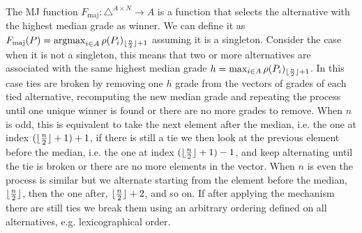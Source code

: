 	The \ac{MJ} function $F_\text{maj}:\triangle^{A \times N} \rightarrow A$	is a function that selects the alternative with the highest median grade as winner. We can define it as $F_\text{maj}(P) = \operatorname*{argmax}_{i\in A}\rho(P_i)_{\lfloor\frac{n}{2}\rfloor+ 1}$ assuming it is a singleton. Consider the case when it is not a singleton, this means that two or more alternatives are associated with the same highest median grade $h=\max_{i\in A}\rho(P_i)_{\lfloor\frac{n}{2}\rfloor + 1}$. In this case ties are broken by removing one $h$ grade from the vectors of grades of each tied alternative, recomputing the new median grade and repeating the process until one unique winner is found or there are no more grades to remove. When $n$ is odd, this is equivalent to take the next element after the median, i.e. the one at index $(\lfloor\frac{n}{2}\rfloor + 1) +1$, if there is still a tie we then look at the previous element before the median, i.e. the one at index $(\lfloor\frac{n}{2}\rfloor + 1) -1$, and keep alternating until the tie is broken or there are no more elements in the vector. When $n$ is even the process is similar but we alternate starting from the element before the median, $\lfloor\frac{n}{2}\rfloor$, then the one after, $\lfloor\frac{n}{2}\rfloor + 2$, and so on. If after applying the mechanism there are still ties we break them using an arbitrary ordering defined on all alternatives, e.g. lexicographical order.
	
